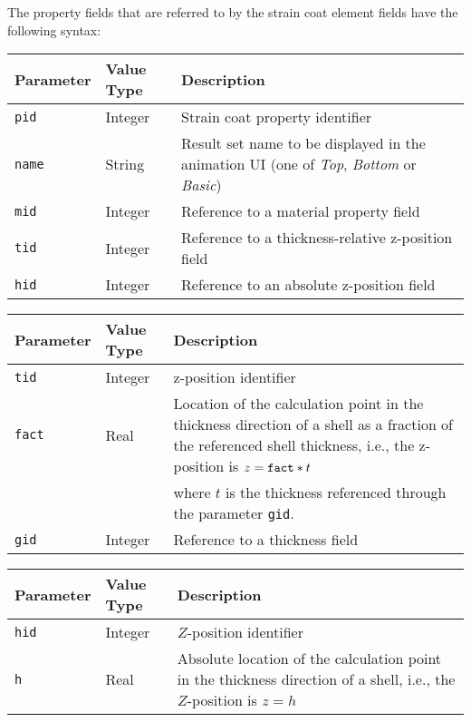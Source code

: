 
The property fields that are referred to by the strain coat element
fields have the following syntax:


\noindent
\begin{tabular}{| m{} | m{} | m{} |}
  \hline
  \rowcolor[HTML]{EFEFEF}
  Parameter  & Value Type & Description \\
  \hline\hline
  {\tt pid}  & Integer & Strain coat property identifier \\
  \hline
  {\tt name} & String & Result set name to be displayed in the animation UI
                        (one of {\sl Top}, {\sl Bottom} or {\sl Basic}) \\
  \hline
  {\tt mid}  & Integer & Reference to a material property field \\
  \hline
  {\tt tid}  & Integer & Reference to a thickness-relative z-position field \\
  \hline
  {\tt hid}  & Integer & Reference to an absolute z-position field \\
  \hline
\end{tabular}


\noindent
\begin{tabular}{| m{} | m{} | m{} |}
  \hline
  \rowcolor[HTML]{EFEFEF}
  Parameter  & Value Type & Description \\
  \hline\hline
  {\tt tid}  & Integer & z-position identifier \\
  \hline
  {\tt fact} & Real & Location of the calculation point in the thickness
                      direction of a shell as a fraction of the referenced
                      shell thickness, i.e., the z-position is $z={\tt fact}*t$ \\
             &      & where $t$ is the thickness referenced through the
                      parameter {\tt gid}. \\
  \hline
  {\tt gid}  & Integer & Reference to a thickness field \\
  \hline
\end{tabular}


\noindent
\begin{tabular}{| m{} | m{} | m{} |}
  \hline
  \rowcolor[HTML]{EFEFEF}
  Parameter & Value Type & Description \\
  \hline\hline
  {\tt hid} & Integer & $Z$-position identifier \\
  \hline
  {\tt h} & Real & Absolute location of the calculation point in the
                   thickness direction of a shell, i.e.,
                   the $Z$-position is $z=h$ \\
  \hline
\end{tabular}


